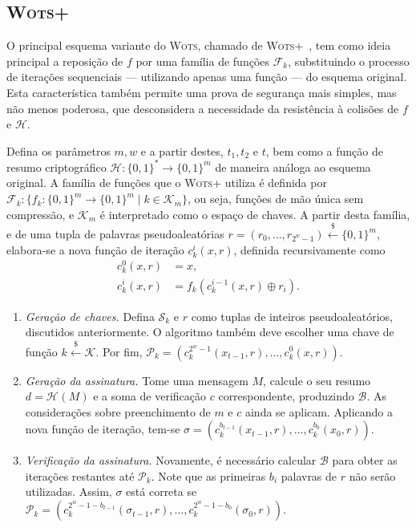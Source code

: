 \documentclass[12pt]{report}
\newcommand{\hh}{\mathcal{H}}
\newcommand{\pk}{\mathcal{P}_k}
\newcommand{\sk}{\mathcal{S}_k}
\newcommand{\hash}[2][]{\mathcal{H}^{#1}(#2)}
\newcommand{\binwds}[1]{\{0, 1\}^{#1}}
\newcommand{\fhash}[1]{\hh{} : \binwds{*} \longrightarrow \binwds{#1}}
\begin{document}
\subsection{\textsc{Wots+}}

O principal esquema variante do \textsc{Wots}, chamado de
\textsc{Wots+}~\cite{Hlsing2013}, tem como ideia principal a
reposição de $f$ por uma família de funções $\mathcal{F}_k$, substituindo o
processo de iterações sequenciais --- utilizando apenas uma função --- do
esquema original. Esta característica também permite uma prova de segurança
mais simples, mas não menos poderosa, que desconsidera a necessidade da
resistência à colisões de $f$ e $\hh{}$.

Defina os parâmetros $m, w$ e a partir destes, $t_1, t_2 \text{ e } t$, bem
como a função de resumo criptográfico $\fhash{m}$ de maneira análoga ao esquema
original. A família de funções que o \textsc{Wots+} utiliza é definida por
$\mathcal{F}_k : \{f_k : \binwds{m} \longrightarrow \binwds{m} \mid k \in
\mathcal{K}_m\}$, ou seja, funções de mão única sem compressão, e
$\mathcal{K}_m$ é interpretado como o espaço de chaves. A partir desta família,
e de uma tupla de palavras pseudoaleatórias $r = (r_0, \dots, r_{2^w - 1})
\stackrel{\$}{\longleftarrow} \binwds{m}$, elabora-se a nova função de iteração
$c^{i}_{k}(x, r)$, definida recursivamente como
\begin{equation}
  \begin{split}
    c^{0}_{k}(x, r) &= x, \\
    c^{i}_{k}(x, r) &= f_k(c^{i-1}_{k}(x, r) \oplus r_i).
  \end{split}
\end{equation}

\begin{enumerate}

  \item[] \emph{Geração de chaves.} Defina $\sk{}$ e $r$ como tuplas de
      inteiros pseudoaleatórios, discutidos anteriormente. O algoritmo também
        deve escolher uma chave de função $k \stackrel{\$}\longleftarrow
        \mathcal{K}$. Por fim, $\pk{} = (c^{2^w-1}_{k}(x_{t-1}, r), \dots,
        c^{0}_{k}(x, r))$.

  \item[] \emph{Geração da assinatura.} Tome uma mensagem $M$, calcule o seu
      resumo $d = \hash{M}$ e a soma de verificação $c$ correspondente,
        produzindo $\mathcal{B}$. As considerações sobre preenchimento de $m$ e
        $c$ ainda se aplicam. Aplicando a nova função de iteração, tem-se
        $\sigma = (c^{b_{t - 1}}_{k}(x_{t-1}, r), \dots, c^{b_{0}}_{k}(x_{0},
        r))$.

  \item[] \emph{Verificação da assinatura.} Novamente, é necessário calcular
      $\mathcal{B}$ para obter as iterações restantes até $\pk{}$. Note que as
        primeiras $b_i$ palavras de $r$ não serão utilizadas. Assim, $\sigma$
        está correta se $\pk{} = (c^{2^{w} - 1 - b_{t - 1}}_{k}(\sigma_{t-1},
        r), \dots, c^{2^{w} - 1 - b_{0}}_{k}(\sigma_{0}, r))$.

\end{enumerate}
\end{document}
